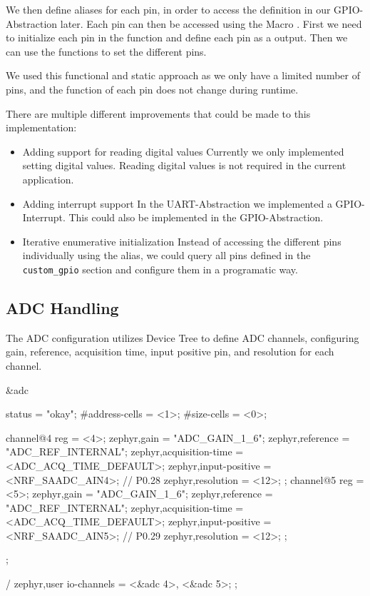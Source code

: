 We then define aliases for each pin, in order to access the definition in our GPIO-Abstraction later.
Each pin can then be accessed using the Macro .
First we need to initialize each pin in the function  and define each pin as a output.
Then we can use the functions  to set the different pins.

We used this functional and static approach as we only have a limited number of pins, and the function of each pin does not change during runtime.

There are multiple different improvements that could be made to this implementation:

\begin{itemize}
    \item Adding support for reading digital values \newline{}Currently we only implemented setting digital values. Reading digital values is not required in the current application.
    \item Adding interrupt support \newline{}In the UART-Abstraction we implemented a GPIO-Interrupt. This could also be implemented in the GPIO-Abstraction.
    \item Iterative enumerative initialization \newline{} Instead of accessing the different pins individually using the alias, we could query all pins defined in the \verb|custom_gpio| section and configure them in a programatic way.
\end{itemize}
 
\subsection{ADC Handling}

The ADC configuration utilizes Device Tree to define ADC channels, configuring gain, reference, acquisition time, input positive pin, and resolution for each channel.

\begin{cpp}[caption={Devicetree ADC-Configuration}]
&adc {
    status = "okay";
    #address-cells = <1>;
    #size-cells = <0>;

    channel@4 {
        reg = <4>;
        zephyr,gain = "ADC_GAIN_1_6";
        zephyr,reference = "ADC_REF_INTERNAL";
        zephyr,acquisition-time = <ADC_ACQ_TIME_DEFAULT>;
        zephyr,input-positive = <NRF_SAADC_AIN4>; // P0.28
        zephyr,resolution = <12>;
    };
    channel@5 {
        reg = <5>;
        zephyr,gain = "ADC_GAIN_1_6";
        zephyr,reference = "ADC_REF_INTERNAL";
        zephyr,acquisition-time = <ADC_ACQ_TIME_DEFAULT>;
        zephyr,input-positive = <NRF_SAADC_AIN5>;  // P0.29
        zephyr,resolution = <12>;
    };
};

/{
    zephyr,user {
        io-channels = <&adc 4>, <&adc 5>;
    };
}
\end{cpp}

